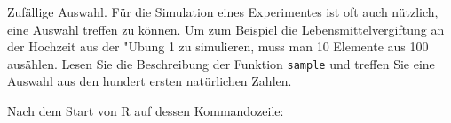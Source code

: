 Zufällige Auswahl. Für die Simulation eines Experimentes ist oft
auch nützlich, eine Auswahl treffen zu können. Um zum Beispiel die
Lebensmittelvergiftung an der Hochzeit aus der "Ubung 1 zu simulieren,
muss man 10 Elemente aus 100 ausählen. Lesen Sie die Beschreibung
der Funktion {\tt sample} und treffen Sie eine Auswahl aus den hundert
ersten natürlichen Zahlen.


\begin{loesung}
Nach dem Start von R auf dessen Kommandozeile:
\end{loesung}

